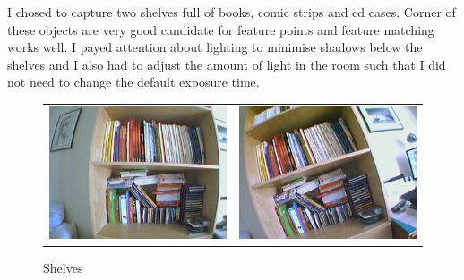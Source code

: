 \documentclass[11pt]{report}
\begin{document}
I chosed to capture two shelves full of books, comic strips and cd cases. Corner of these objects are very good candidate for feature points and feature matching works well. I payed attention about lighting to minimise shadows below the shelves and I also had to adjust the amount of light in the room such that I did not need to change the default exposure time.

\begin{figure}[H]
\begin{tabular}{cc}
\includegraphics[scale=0.25]{images/shelves_left.png} &
\includegraphics[scale=0.25]{images/shelves_right.png} \\
\end{tabular}
\caption{Shelves}
\end{figure}
\end{document}
